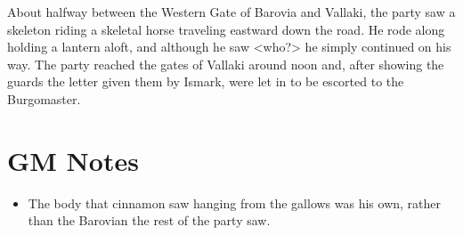 \documentclass[a4paper,11pt]{article}
\begin{document}
About halfway between the Western Gate of Barovia and Vallaki, the party saw a skeleton riding a skeletal horse
traveling eastward down the road. He rode along holding a lantern aloft, and although he saw <who?> he simply
continued on his way. The party reached the gates of Vallaki around noon and, after showing the guards the letter
given them by Ismark, were let in to be escorted to the Burgomaster.

\section{GM Notes}
\begin{itemize}
  \item The body that cinnamon saw hanging from the gallows was his own, rather than the Barovian the rest of the 
  party saw.
\end{itemize}
\end{document}
